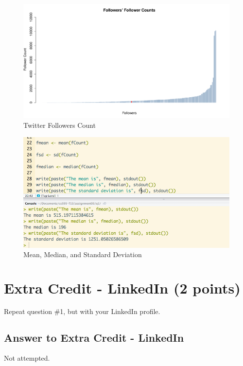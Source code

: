 \documentclass{article}
\begin{document}
\begin{figure}[H]
\centering
\includegraphics[scale=0.38]{q2/FollowerCountGraph}
\caption{Twitter Followers Count}
\label{followercounts}
\end{figure}

\begin{figure}[H]
\centering
\includegraphics[scale=0.50]{q2/statsoutput}
\caption{Mean, Median, and Standard Deviation}
\label{statsoutputfollowers}
\end{figure}

\clearpage

\section*{Extra Credit - LinkedIn (2 points)}

Repeat question \#1, but with your LinkedIn profile.

\subsection*{Answer to Extra Credit - LinkedIn}

Not attempted.
\end{document}
